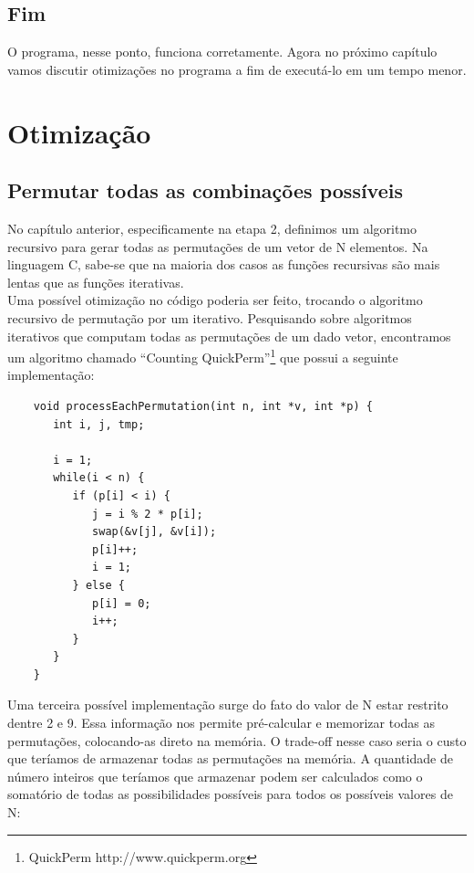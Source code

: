 \documentclass[12pt,a4paper]{article}
\begin{document}
	\subsection{Fim}
	\indent O programa, nesse ponto, funciona corretamente. Agora no próximo capítulo vamos discutir otimizações no programa a fim de executá-lo em um tempo menor.




	\section{Otimização}

	\subsection{Permutar todas as combinações possíveis}
	\indent No capítulo anterior, especificamente na etapa 2, definimos um algoritmo recursivo para gerar todas as permutações de um vetor de N elementos. Na linguagem C, sabe-se que na maioria dos casos as funções recursivas são mais lentas que as funções iterativas.\\
	\indent Uma possível otimização no código poderia ser feito, trocando o algoritmo recursivo de permutação por um iterativo. Pesquisando sobre algoritmos iterativos que computam todas as permutações de um dado vetor, encontramos um algoritmo chamado “Counting QuickPerm”\footnote{QuickPerm http://www.quickperm.org} que possui a seguinte implementação:\\
	\begin{minipage}{\linewidth}
	\begin{lstlisting}
	void processEachPermutation(int n, int *v, int *p) {
	   int i, j, tmp; 

	   i = 1;   
	   while(i < n) {
	      if (p[i] < i) {
	         j = i % 2 * p[i];   
	         swap(&v[j], &v[i]);
	         p[i]++;             
	         i = 1;              
	      } else {               
	         p[i] = 0;           
	         i++;                
	      } 
	   } 
	}
	\end{lstlisting}
	\end{minipage}
	\indent Uma terceira possível implementação surge do fato do valor de N estar restrito dentre 2 e 9. Essa informação nos permite pré-calcular e memorizar todas as permutações, colocando-as direto na memória. O trade-off nesse caso seria o custo que teríamos de armazenar todas as permutações na memória. A quantidade de número inteiros que teríamos que armazenar podem ser calculados como o somatório de todas as possibilidades possíveis para todos os possíveis valores de N:
\end{document}
